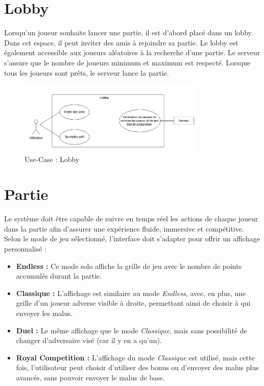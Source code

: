 \documentclass{report}
\begin{document}
\section{Lobby}

\noindent Lorsqu'un joueur souhaite lancer une partie, il est d'abord placé dans un lobby. Dans cet espace, il peut inviter des amis à rejoindre sa partie. Le lobby est également accessible aux joueurs aléatoires à la recherche d'une partie. Le serveur s'assure que le nombre de joueurs minimum et maximum est respecté. Lorsque tous les joueurs sont prêts, le serveur lance la partie.

\vspace{-1em}

\begin{figure}[H]
    \centering
     \includegraphics[width=0.8\textwidth, keepaspectratio]{src/sys_req/lobby.png}
    \caption{Use-Case : Lobby}
    \label{fig:use_case_lobby_sys_req}
\end{figure}

\section{Partie}

\noindent Le système doit être capable de suivre en temps réel les actions de chaque joueur dans la partie afin d'assurer une expérience fluide, immersive et compétitive. Selon le mode de jeu sélectionné, l'interface doit s'adapter pour offrir un affichage personnalisé :

\begin{itemize}
    \item \textbf{Endless :} Ce mode solo affiche la grille de jeu avec le nombre de points accumulés durant la partie.
    \item \textbf{Classique :} L'affichage est similaire au mode \emph{Endless}, avec, en plus, une grille d'un joueur adverse visible à droite, permettant ainsi de choisir à qui envoyer les malus.
    \item \textbf{Duel :} Le même affichage que le mode \emph{Classique}, mais sans possibilité de changer d'adversaire visé (car il y en a qu'un).
    \item \textbf{Royal Competition :} L'affichage du mode \emph{Classique} est utilisé, mais cette fois, l'utilisateur peut choisir d'utiliser des bonus ou d'envoyer des malus plus avancés, sans pouvoir envoyer le malus de base.
\end{itemize}
\end{document}
